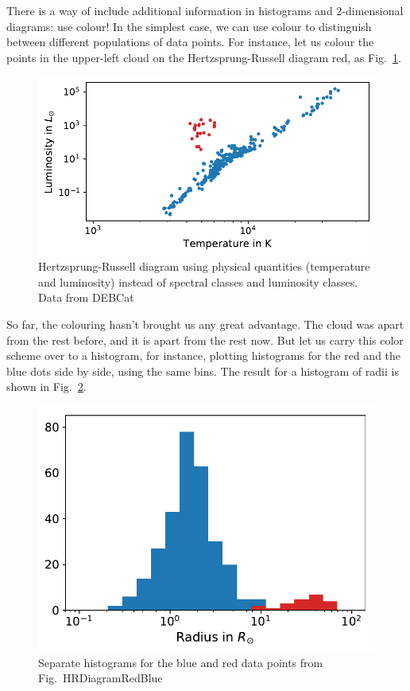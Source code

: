 \documentclass[twocolumn,apj]{openjournal}
\begin{document}
There is a way of include additional information in histograms and 2-dimensional diagrams: use colour! In the simplest case, we can use colour to distinguish between different populations of data points. For instance, let us colour the points in the upper-left cloud on the Hertzsprung-Russell diagram red, as Fig.~\ref{HRDiagramRedBlue}.
\begin{figure}[htbp]
\begin{center}
\includegraphics[width=\linewidth]{temp-leuchtkraft-DEB-redblue.pdf}
\caption{Hertzsprung-Russell diagram using physical quantities (temperature and luminosity) instead of spectral classes and luminosity classes. Data from DEBCat}
\label{HRDiagramRedBlue}
\end{center}
\end{figure}
So far, the colouring hasn't brought us any great advantage. The cloud was apart from the rest before, and it is apart from the rest now. But let us carry this color scheme over to a histogram, for instance, plotting histograms for the red and the blue dots side by side, using the same bins. The result for a histogram of radii is shown in Fig.~\ref{RadiiBlueRed}.
\begin{figure}[htbp]
\begin{center}
\includegraphics[width=0.8\linewidth]{radius-distribution-DEB-bluered.pdf}
\caption{Separate histograms for the blue and red data points from Fig.~{HRDiagramRedBlue} }
\label{RadiiBlueRed}
\end{center}
\end{figure}
\end{document}
